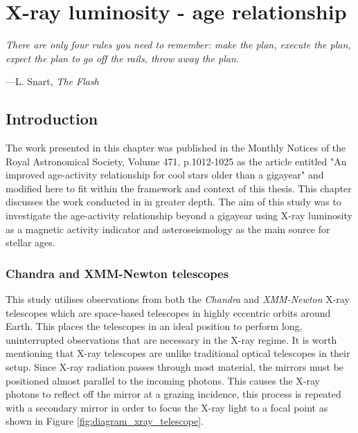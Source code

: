 
\chapter{X-ray luminosity - age relationship} %

\label{Chapter3} %
\newcommand{\Chandra}{\textit{Chandra}\xspace}
\newcommand{\XMM}{\textit{XMM-Newton}\xspace}

\epigraph{\itshape There are only four rules you need to remember: make the plan, execute the plan, expect the plan to go off the rails, throw away the plan.}{---L. Snart, \itshape The Flash}

\section{Introduction}
The work presented in this chapter was published in the Monthly Notices of the Royal Astronomical Society, Volume 471, p.1012-1025 as the article entitled "An improved age-activity relationship for cool stars older than a gigayear" \citep{Booth_etal_2017} and modified here to fit within the framework and context of this thesis. This chapter discusses the work conducted in \citet{Booth_etal_2017} in greater depth. The aim of this study was to investigate the age-activity relationship beyond a gigayear using X-ray luminosity as a magnetic activity indicator and asteroseismology as the main source for stellar ages.

\subsection{Chandra and XMM-Newton telescopes}
This study utilises observations from both the \Chandra and \XMM X-ray telescopes which are space-based telescopes in highly eccentric orbits around Earth. This places the telescopes in an ideal position to perform long, uninterrupted observations that are necessary in the X-ray regime. It is worth mentioning that X-ray telescopes are unlike traditional optical telescopes in their setup. Since X-ray radiation passes through most material, the mirrors must be positioned almost parallel to the incoming photons. This causes the X-ray photons to reflect off the mirror at a grazing incidence, this process is repeated with a secondary mirror in order to focus the X-ray light to a focal point as shown in Figure \ref{fig:diagram_xray_telescope}.

